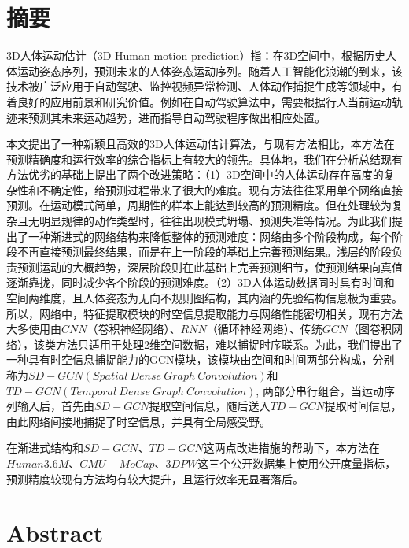 \chapter{摘\texorpdfstring{\quad}{}要}
	3D人体运动估计（3D Human motion prediction）指：在3D空间中，根据历史人体运动姿态序列，预测未来的人体姿态运动序列。随着人工智能化浪潮的到来，该技术被广泛应用于自动驾驶、监控视频异常检测、人体动作捕捉生成等领域中，有着良好的应用前景和研究价值。例如在自动驾驶算法中，需要根据行人当前运动轨迹来预测其未来运动趋势，进而指导自动驾驶程序做出相应处置。
	
	本文提出了一种新颖且高效的3D人体运动估计算法，与现有方法相比，本方法在预测精确度和运行效率的综合指标上有较大的领先。具体地，我们在分析总结现有方法优劣的基础上提出了两个改进策略：（1）3D空间中的人体运动存在高度的复杂性和不确定性，给预测过程带来了很大的难度。现有方法往往采用单个网络直接预测。在运动模式简单，周期性的样本上能达到较高的预测精度。但在处理较为复杂且无明显规律的动作类型时，往往出现模式坍塌、预测失准等情况。为此我们提出了一种渐进式的网络结构来降低整体的预测难度：网络由多个阶段构成，每个阶段不再直接预测最终结果，而是在上一阶段的基础上完善预测结果。浅层的阶段负责预测运动的大概趋势，深层阶段则在此基础上完善预测细节，使预测结果向真值逐渐靠拢，同时减少各个阶段的预测难度。（2）3D人体运动数据同时具有时间和空间两维度，且人体姿态为无向不规则图结构，其内涵的先验结构信息极为重要。所以，网络中，特征提取模块的时空信息提取能力与网络性能密切相关，现有方法大多使用由$CNN$（卷积神经网络）、$RNN$（循环神经网络）、传统$GCN$（图卷积网络），该类方法只适用于处理2维空间数据，难以捕捉时序联系。为此，我们提出了一种具有时空信息捕捉能力的GCN模块，该模块由空间和时间两部分构成，分别称为$SD-GCN(Spatial \ Dense \ Graph \ Convolution)$和$TD-GCN(Temporal \ Dense \ Graph \ Convolution)$, 两部分串行组合，当运动序列输入后，首先由$SD-GCN$提取空间信息，随后送入$TD-GCN$提取时间信息，由此网络间接地捕捉了时空信息，并具有全局感受野。
	
	在渐进式结构和$SD-GCN$、$TD-GCN$这两点改进措施的帮助下，本方法在$Human3.6M$、$CMU-MoCap$、$3DPW$这三个公开数据集上使用公开度量指标，预测精度较现有方法均有较大提升，且运行效率无显著落后。



\chapter{Abstract}
	

